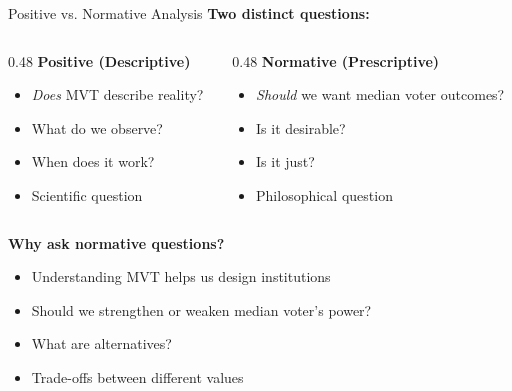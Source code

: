 \documentclass[10pt]{beamer}
\begin{document}
\begin{frame}{Positive vs. Normative Analysis}
\textbf{Two distinct questions:}


\begin{columns}
\begin{column}{0.48\textwidth}
\textbf{Positive (Descriptive)}
\begin{itemize}
\item \textit{Does} MVT describe reality?
\item What do we observe?
\item When does it work?
\item Scientific question
\end{itemize}
\end{column}


\begin{column}{0.48\textwidth}
\textbf{Normative (Prescriptive)}
\begin{itemize}
\item \alert{\textit{Should} we want median voter outcomes?}
\item Is it desirable?
\item Is it just?
\item Philosophical question
\end{itemize}
\end{column}
\end{columns}



\textbf{Why ask normative questions?}
\begin{itemize}
\item Understanding MVT helps us design institutions
\item Should we strengthen or weaken median voter's power?
\item What are alternatives?
\item Trade-offs between different values
\end{itemize}
\end{frame}
\end{document}
